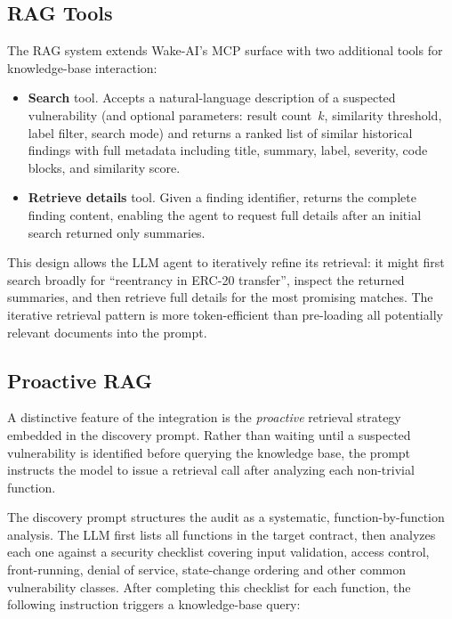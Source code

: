 \subsection{RAG Tools}
\label{subsec:mcp-wake}

The RAG system extends Wake-AI's MCP surface with two additional tools for knowledge-base interaction:

\begin{itemize}
    \item \textbf{Search} tool. Accepts a natural-language description of a suspected vulnerability (and optional parameters: result count~$k$, similarity threshold, label filter, search mode) and returns a ranked list of similar historical findings with full metadata including title, summary, label, severity, code blocks, and similarity score.

    \item \textbf{Retrieve details} tool. Given a finding identifier, returns the complete finding content, enabling the agent to request full details after an initial search returned only summaries.
\end{itemize}

This design allows the LLM agent to iteratively refine its retrieval: it might first search broadly for ``reentrancy in ERC-20 transfer'', inspect the returned summaries, and then retrieve full details for the most promising matches. The iterative retrieval pattern is more token-efficient than pre-loading all potentially relevant documents into the prompt.

\subsection{Proactive RAG}
\label{subsec:proactive-rag}

A distinctive feature of the integration is the \emph{proactive} retrieval strategy embedded in the discovery prompt. Rather than waiting until a suspected vulnerability is identified before querying the knowledge base, the prompt instructs the model to issue a retrieval call after analyzing each non-trivial function.

The discovery prompt structures the audit as a systematic, function-by-function analysis. The LLM first lists all functions in the target contract, then analyzes each one against a security checklist covering input validation, access control, front-running, denial of service, state-change ordering and other common vulnerability classes. After completing this checklist for each function, the following instruction triggers a knowledge-base query:

